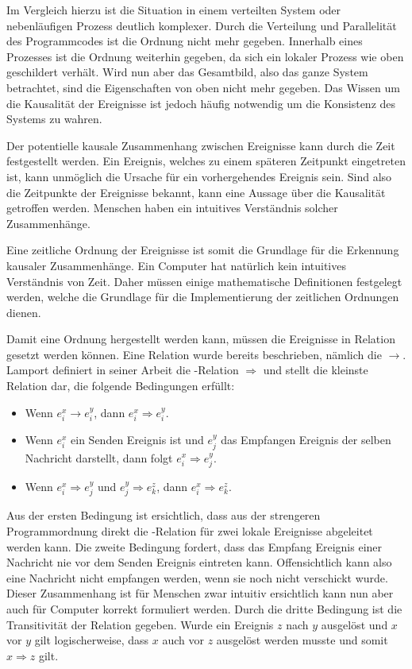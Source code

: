 Im Vergleich hierzu ist die Situation in einem verteilten System oder nebenläufigen Prozess deutlich komplexer.
Durch die Verteilung und Parallelität des Programmcodes ist die  Ordnung nicht mehr gegeben.
Innerhalb eines Prozesses ist die Ordnung weiterhin gegeben, da sich ein lokaler Prozess wie oben geschildert verhält.
Wird nun aber das Gesamtbild, also das ganze System betrachtet, sind die Eigenschaften von oben nicht mehr gegeben.
Das Wissen um die Kausalität der Ereignisse ist jedoch häufig notwendig um die Konsistenz des Systems zu wahren.

Der potentielle kausale Zusammenhang zwischen Ereignisse kann durch die Zeit festgestellt werden.
Ein Ereignis, welches zu einem späteren Zeitpunkt eingetreten ist, kann unmöglich die Ursache für ein vorhergehendes Ereignis sein.
Sind also die Zeitpunkte der Ereignisse bekannt, kann eine Aussage über die Kausalität getroffen werden.
Menschen haben ein intuitives Verständnis solcher Zusammenhänge.

Eine zeitliche Ordnung der Ereignisse ist somit die Grundlage für die Erkennung kausaler Zusammenhänge.
Ein Computer hat natürlich kein intuitives Verständnis von Zeit.
Daher müssen einige mathematische Definitionen festgelegt werden, welche die Grundlage für die Implementierung der zeitlichen Ordnungen dienen.

Damit eine Ordnung hergestellt werden kann, müssen die Ereignisse in Relation gesetzt werden können.
Eine Relation wurde bereits beschrieben, nämlich die  $\rightarrow$.
Lamport \cite{Lamport1978} definiert in seiner Arbeit die -Relation $\Rightarrow$ und stellt die kleinste Relation dar, die folgende Bedingungen erfüllt:
\begin{itemize}
    \item Wenn $e_i^x \rightarrow e_i^y$, dann $e_i^x \Rightarrow e_i^y$.
    \item Wenn $e_i^x$ ein Senden Ereignis ist und $e_j^y$ das Empfangen Ereignis der selben Nachricht darstellt, dann folgt $e_i^x \Rightarrow e_j^y$.
    \item Wenn $e_i^x \Rightarrow e_j^y$ und $e_j^y \Rightarrow e_k^z$, dann $e_i^x \Rightarrow e_k^z$.
\end{itemize}

Aus der ersten Bedingung ist ersichtlich, dass aus der strengeren Programmordnung direkt die -Relation für zwei lokale Ereignisse abgeleitet werden kann.
Die zweite Bedingung fordert, dass das Empfang Ereignis einer Nachricht nie vor dem Senden Ereignis eintreten kann.
Offensichtlich kann also eine Nachricht nicht empfangen werden, wenn sie noch nicht verschickt wurde.
Dieser Zusammenhang ist für Menschen zwar intuitiv ersichtlich kann nun aber auch für Computer korrekt formuliert werden.
Durch die dritte Bedingung ist die Transitivität der Relation gegeben.
Wurde ein Ereignis $z$ nach $y$ ausgelöst und $x$ vor $y$ gilt logischerweise, dass $x$ auch vor $z$ ausgelöst werden musste und somit $x\Rightarrow z$ gilt.

